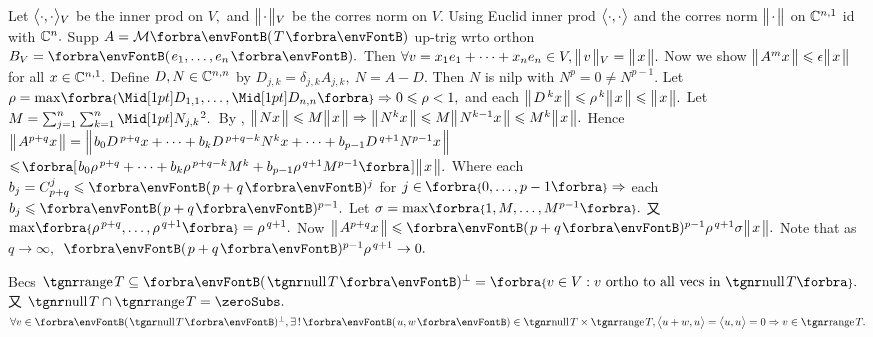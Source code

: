 Let $\big\langle{}\cdot,\cdot{}\big\rangle{_V}$ be the inner prod on $V,$ and $\big\Vert\hspace{1pt}{}{\cdot}{}\hspace{1pt}\big\Vert{_V}$ be the corres norm on $V.$\parSol{}
Using Euclid inner prod $\big\langle{}\cdot,\cdot{}\big\rangle$ and the corres norm $\big\Vert\hspace{1pt}{}{\cdot}{}\hspace{1pt}\big\Vert$ on ${\mathbb{C}}^{n,1}$ id with ${\mathbb{C}}^n.$\parSol{}
Supp $A=\Mt{T}$ up-trig wrto orthon $B_V=\Par{e_1,\dots,e_n}.$\parSol{}
Then $\forall v=x_1e_1+\dots+x_ne_n\in V,\big\Vert\hspace{1pt}{}v{}\hspace{1pt}\big\Vert{_V}=\big\Vert\hspace{1pt}{}x{}\hspace{1pt}\big\Vert.$ Now we show $\big\Vert\hspace{1pt}{}A^mx{}\hspace{1pt}\big\Vert\leqslant\epsilon\big\Vert\hspace{1pt}{}x{}\hspace{1pt}\big\Vert$ for all $x\in{\mathbb{C}}^{n,1}.$\parSol{}
Define $D,N\in{\mathbb{C}}^{n,n}$ by $D_{j,k}=\delta_{j,k}A_{j,k},\:N=A-D.$ Then $N$ is nilp with $N^p=0\neq N^{p-1}.$\parSol{}
Let $\rho=\max\!\Bra{\aMid{D_{1,1}},\dots,\aMid{D_{n,n}}}\Rightarrow0\leqslant\rho<1,$ and each $\big\Vert\hspace{1pt}{}D^{\,k}x{}\hspace{1pt}\big\Vert\leqslant\rho^{\,k}\big\Vert\hspace{1pt}{}x{}\hspace{1pt}\big\Vert\leqslant\big\Vert\hspace{1pt}{}x{}\hspace{1pt}\big\Vert.$\vspace{1pt}\parSol{}
Let $M=\sum_{j=1}^n\sum_{k=1}^n\aMidsq{N_{j,k}}.$ \,{By }, $\big\Vert\hspace{1pt}{}Nx{}\hspace{1pt}\big\Vert\leqslant M\big\Vert\hspace{1pt}{}x{}\hspace{1pt}\big\Vert\Rightarrow\big\Vert\hspace{1pt}{}N^{k}x{}\hspace{1pt}\big\Vert\leqslant M\big\Vert\hspace{1pt}{}N^{k-1}x{}\hspace{1pt}\big\Vert\leqslant M^k\big\Vert\hspace{1pt}{}x{}\hspace{1pt}\big\Vert.$\vspace{1pt}\parSol{}
Hence $\big\Vert\hspace{1pt}{}A^{p+q}x{}\hspace{1pt}\big\Vert=\Big\Vert\hspace{1pt}{}b_0D^{\,p+q}x+\dots+b_kD^{\,p+q-k}N^{k}x+\dots+b_{p-1}D^{\,q+1}N^{p-1}x{}\hspace{1pt}\Big\Vert$\vspace{3pt}\parSol{}
$\leqslant\!\BigSbra{{b_0\rho^{\,p+q}+\dots+b_k\rho^{\,p+q-k}M^k+b_{p-1}\rho^{\,q+1}M^{p-1}}}\Dvert{x}.$\vspace{2pt}\parSol{}
Where each $b_j=\mathC_{p+q}^j\leqslant\Par{p+q}{^j}$ for $j\in\;\!\!\Bra{0,\dots,p-1}\Rightarrow$ each $b_j\leqslant\Par{p+q}{^{p-1}}.$\vspace{1pt}\parSol{}
Let $\sigma=\max\!\Bra{1,M,\dots,M^{p-1}}.$ 又 $\max\!\Bra{\rho^{\,p+q},\dots,\rho^{\,q+1}}=\rho^{\,q+1}.$\parSol{}
Now $\Dvert{A^{p+q}x}\leqslant\Par{p+q}{^{p-1}}\rho^{\,q+1}\sigma\Dvert{x}.$ \;Note that as $q\rightarrow\infty,$ \,$\Par{p+q}{^{p-1}}\rho^{\,q+1}\rightarrow0.$\PfEnd
\SepLine
\ChEnd

\pagebreak


\vspace{4pt}

Becs $\range T\subseteq\Par{\null T}{^\perp}=\Bra{v\in V:v\text{ ortho to all vecs in }\null T}.$ 又 $\null T\cap\range T=\zeroSubs.$\PfEnd\parSol{}
\Or $\forall v\in\Par{\null T}{^\perp},\exists\,!\,\Par{u,w}\in\null T\times\range T,\Ang{u+w,u}=\Ang{u,u}=0\Rightarrow v\in\range T.$\PfEnd
\SepLine

